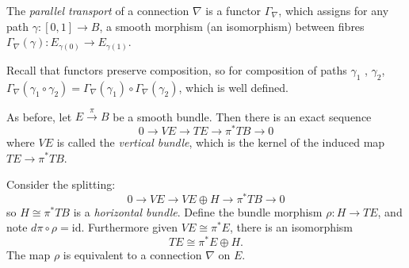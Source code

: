 
    
    \begin{defn} The \emph{parallel transport} of a connection \( \nabla\) is a functor \(\Gamma_{\nabla}\), which assigns for any path \( \gamma : [0,1] \rightarrow B\), a smooth morphism (an isomorphism) between fibres \( \Gamma_{\nabla}(\gamma) : E_{\gamma(0)} \rightarrow E_{\gamma(1)}\).
    \end{defn}
    Recall that functors preserve composition, so for composition of paths \( \gamma_1\) , \( \gamma_2\), \( \Gamma_{\nabla}(\gamma_1 \circ \gamma_2) = \Gamma_{\nabla}(\gamma_1) \circ \Gamma_{\nabla}(\gamma_2) \), which is well defined.
    
    
    
    
    As before, let \( E \stackrel{\pi}{\rightarrow} B\) be a smooth bundle. Then there is an exact sequence
    \[ 0 \rightarrow V E \rightarrow TE \rightarrow \pi^{*} TB \rightarrow 0\]
    where \(VE\) is called the \emph{vertical bundle}, which is the kernel of the induced map \( TE \rightarrow \pi^{*} TB\). 
    
    Consider the splitting:
    \[ 0 \rightarrow VE \rightarrow VE \oplus H \rightarrow \pi^{*} TB \rightarrow 0\]
    so \(H \cong \pi^{*} TB\) is a  \emph{horizontal bundle}. Define the bundle morphism \( \rho : H \rightarrow TE\), and note \( d \pi \circ \rho = \mathrm{id} \). Furthermore given \(VE \cong \pi^{*} E\),  there is an isomorphism \[ TE \cong \pi^{*} E \oplus H .\]
    The map \( \rho \) is equivalent to a connection \( \nabla\) on \(E\).
    

